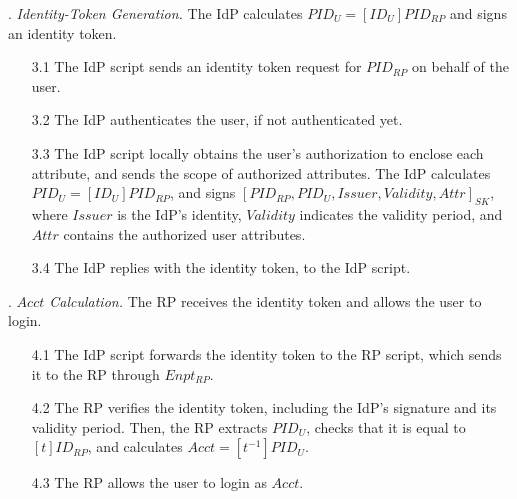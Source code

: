 . {\em Identity-Token Generation.}
The IdP calculates $PID_U = [ID_U]{PID_{RP}}$ and signs an identity token. %
\vspace{-\topsep}
\begin{itemize}
\setlength{\topsep}{0pt}
\setlength{\partopsep}{0pt}
\setlength{\itemsep}{0pt}
\setlength{\parsep}{0pt}
\setlength{\parskip}{0pt}
\item[3.1]
The IdP script sends an identity token request for $PID_{RP}$ on behalf of the user. %

\item[3.2] The IdP authenticates the user, if not authenticated yet.

\item [3.3]
The IdP script locally obtains the user's authorization to enclose each attribute,
    and sends the scope of authorized attributes. %
The IdP %
    calculates $PID_U = [ID_U]{PID_{RP}}$, %
and signs $[PID_{RP}, PID_U, Issuer, Validity, Attr]_{SK}$,
 where $Issuer$ is the IdP's identity, $Validity$ indicates the validity period, and $Attr$ contains the authorized user attributes.
\item[3.4] The IdP replies with the identity token, to the IdP script.
\end{itemize}

. {\em $Acct$ Calculation.}
The RP receives the identity token and allows the user to login.
\vspace{-\topsep}
\begin{itemize}
\setlength{\topsep}{0pt}
\setlength{\partopsep}{0pt}
\setlength{\itemsep}{0pt}
\setlength{\parsep}{0pt}
\setlength{\parskip}{0pt}
\item [4.1]
The IdP script forwards the identity token to the RP script,
    which sends it to the RP through $Enpt_{RP}$.
\item[4.2] The RP verifies the identity token, including the IdP's signature and its validity period.
Then, the RP extracts $PID_U$, checks that it is equal to $[t]ID_{RP}$,
and calculates $Acct = [t^{-1}]{PID_U}$.

\item [4.3] The RP allows the user to login as $Acct$.

\end{itemize}


